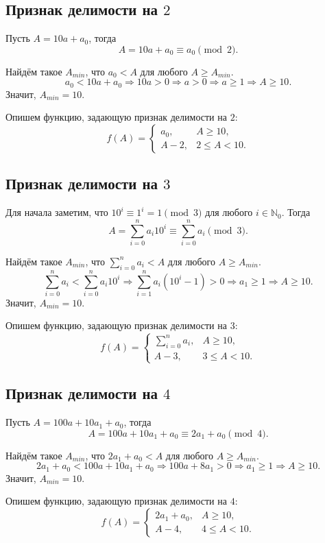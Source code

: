 \documentclass[14pt, a4paper]{extarticle}
\theoremstyle{definition}
\begin{document}
\subsection{Признак делимости на $2$}

	Пусть $A=10a+a_0$, тогда
	$$A=10a+a_0\equiv a_0\pmod2.$$

	Найдём такое $A_{min}$, что $a_0<A$ для любого $A\geqslant A_{min}$. 
	$$a_0<10a+a_0\Rightarrow10a>0\Rightarrow a>0\Rightarrow a\geqslant1\Rightarrow A\geqslant10.$$
	Значит, $A_{min}=10$.

	Опишем функцию, задающую признак делимости на $2$:
	$$f(A)=\begin{cases}
		a_0,&A\geqslant10,\\
		A-2,&2\leqslant A<10.
	\end{cases}$$

\subsection{Признак делимости на $3$}

	Для начала заметим, что $10^i\equiv1^i=1\pmod3$ для любого $i\in\mathbb{N}_0$. Тогда
	$$A=\sum_{i=0}^na_i10^i\equiv\sum_{i=0}^na_i\pmod3.$$

	Найдём такое $A_{min}$, что $\sum_{i=0}^na_i<A$ для любого $A\geqslant A_{min}$. 
	$$\sum_{i=0}^na_i<\sum_{i=0}^na_i10^i\Rightarrow\sum_{i=1}^na_i(10^i-1)>0\Rightarrow a_1\geqslant1\Rightarrow A\geqslant10.$$
	Значит, $A_{min}=10$.

	Опишем функцию, задающую признак делимости на $3$:
	$$f(A)=\begin{cases}
		\sum_{i=0}^na_i,&A\geqslant10,\\
		A-3,&3\leqslant A<10.
	\end{cases}$$

\subsection{Признак делимости на $4$}

	Пусть $A=100a+10a_1+a_0$, тогда
	$$A=100a+10a_1+a_0\equiv2a_1+a_0\pmod4.$$

	Найдём такое $A_{min}$, что $2a_1+a_0<A$ для любого $A\geqslant A_{min}$. 
	$$2a_1+a_0<100a+10a_1+a_0\Rightarrow100a+8a_1>0\Rightarrow a_1\geqslant1\Rightarrow A\geqslant10.$$
	Значит, $A_{min}=10$.

	Опишем функцию, задающую признак делимости на $4$:
	$$f(A)=\begin{cases}
		2a_1+a_0,&A\geqslant10,\\
		A-4,&4\leqslant A<10.
	\end{cases}$$
\end{document}
